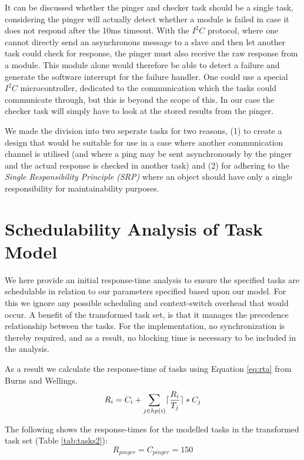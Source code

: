 It can be discussed whether the pinger and checker task should be a single task, considering the pinger will actually detect whether a module is failed in case it does not respond after the 10ms timeout. With the $\textit{I}^2\textit{C}$ protocol, where one cannot directly send an asynchronous message to a slave and then let another task could check for response, the pinger must also receive the raw response from a module. This module alone would therefore be able to detect a failure and generate the software interrupt for the failure handler. One could use a special $\textit{I}^2\textit{C}$ microcontroller, dedicated to the communication which the tasks could communicate through, but this is beyond the scope of this. In our case the checker task will simply have to look at the stored results from the pinger.

We made the division into two seperate tasks for two reasons, (1) to create a design that would be suitable for use in a case where another communication channel is utilised (and where a ping may be sent asynchronously by the pinger and the actual response is checked in another task) and (2) for adhering to the \textit{Single Responsibility Principle (SRP)} where an object should have only a single responsibility for maintainability purposes.

\section{Schedulability Analysis of Task Model}
We here provide an initial response-time analysis to ensure the specified tasks are schedulable in relation to our parameters specified based upon our model. For this we ignore any possible scheduling and context-switch overhead that would occur. A benefit of the transformed task set, is that it manages the precedence relationship between the tasks. For the implementation, no synchronization is thereby required, and as a result, no blocking time is necessary to be included in the analysis.

As a result we calculate the response-time of tasks using Equation \ref{eq:rta} from Burns and Wellings.
\begin{equation}
\label{eq:rta}
     R_{i} = C_{i} + \sum\limits_{j\in hp(i)} \lceil\frac{R_{i}}{T_{j}}\rceil*C_{j}
\end{equation}

The following shows the response-times for the modelled tasks in the transformed task set (Table \ref{tab:tasks2}):
\begin{equation}
\label{eq:pingerrta}
     R_{pinger} = C_{pinger} = 150 
\end{equation}

